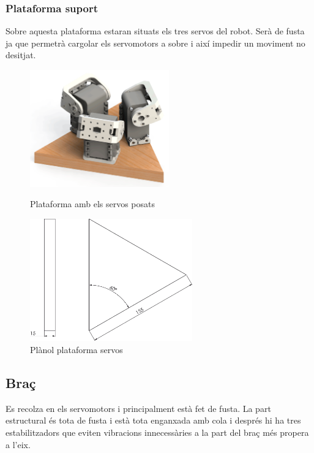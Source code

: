 \subsubsection{Plataforma suport}
Sobre aquesta plataforma estaran situats els tres servos del robot. Serà de fusta ja que permetrà cargolar els servomotors a sobre i així impedir un moviment no desitjat.
\begin{figure}[h!]
\centering
\begin{minipage}[b]{0.45\linewidth}
\centering
\includegraphics[width=6cm]{./imgComp/plataforma}
\caption{Plataforma amb els servos posats}
\end{minipage}
\hfill
\begin{minipage}[b]{0.45\linewidth}
\centering
\includegraphics[width=7cm]{./sketch/plataforma}
\caption{Plànol plataforma servos}
\end{minipage}
\end{figure}


\newpage
\subsection{Braç}
Es recolza en els servomotors i principalment està fet de fusta. La part estructural és tota de fusta i està tota enganxada amb cola i després hi ha tres estabilitzadors que eviten vibracions innecessàries a la part del braç més propera a l'eix. 

